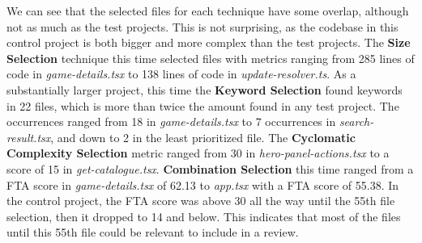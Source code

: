 We can see that the selected files for each technique have some overlap, although not as much as the test projects. This is not surprising, as the codebase in this control project is both bigger and more complex than the test projects.
The \textbf{Size Selection} technique this time selected files with metrics ranging from 285 lines of code in \textit{game-details.tsx} to 138 lines of code in \textit{update-resolver.ts}. 
As a substantially larger project, this time the \textbf{Keyword Selection} found keywords in 22 files, which is more than twice the amount found in any test project. The occurrences ranged from 18 in \textit{game-details.tsx} to 7 occurrences in \textit{search-result.tsx}, and down to 2 in the least prioritized file.
The \textbf{Cyclomatic Complexity Selection} metric ranged from 30 in \textit{hero-panel-actions.tsx} to a score of 15 in \textit{get-catalogue.tsx}. 
\textbf{Combination Selection} this time ranged from a FTA score in \textit{game-details.tsx} of 62.13 to \textit{app.tsx} with a FTA score of 55.38. In the control project, the FTA score was above 30 all the way until the 55th file selection, then it dropped to 14 and below. This indicates that most of the files until this 55th file could be relevant to include in a review. \\


